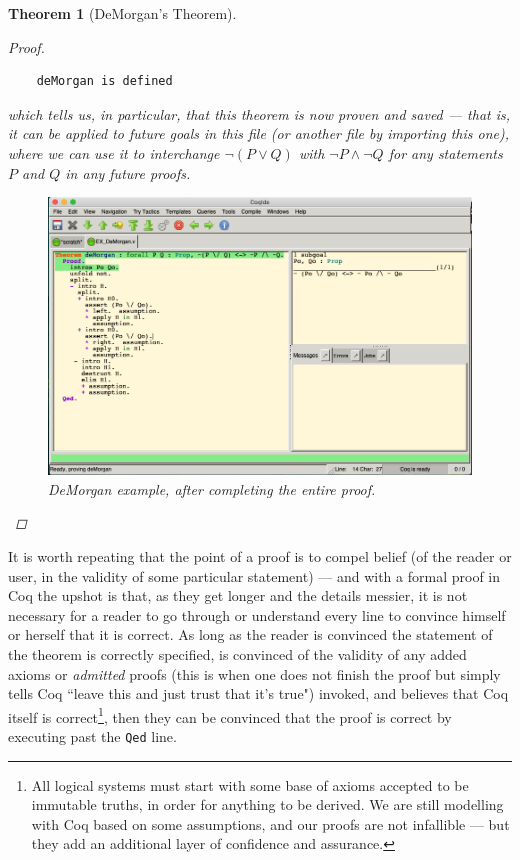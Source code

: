 \documentclass[12pt,notitlepage]{report}
\theoremstyle{plain}
\newtheorem{theo}{Theorem}[section]
\theoremstyle{definition}
\newcommand{\define}[1]{\emph{#1}\index{#1}}
\numberwithin{equation}{section}
\begin{document}
\begin{theo}[DeMorgan's Theorem]
\begin{proof}
\begin{verbatim}
    deMorgan is defined
\end{verbatim}
        which tells us, in particular, that this theorem is now proven and \emph{saved} --- that is, it can be \define{applied} to future goals in this file (or another file by importing this one), where we can use it to  interchange $\neg(P\lor Q)$ with $\neg P \land \neg Q$ for any statements $P$ and $Q$ in any future proofs.
        \par \noindent
\begin{figure}[H]
    \centering
          \includegraphics[scale=0.45]{DeMorgan}
              \caption{DeMorgan example, after completing the entire proof.}
    \label{fig:demorgan1}
\end{figure}
    \end{proof}
\end{theo}
It is worth repeating that the point of a proof is to compel belief (of the reader or user, in the validity of some particular statement) --- and with a formal proof in Coq the upshot is that, as they get longer and the details messier, it is not necessary for a reader to go through or understand every line to convince himself or herself that it is correct.  As long as the reader is convinced the statement of the theorem is correctly specified, is convinced of the validity of any added axioms or \define{admitted} proofs (this is when one does not finish the proof but simply tells Coq ``leave this and just trust that it's true") invoked, and believes that Coq itself is correct\footnote{All logical systems must start with some base of axioms accepted to be immutable truths, in order for anything to be derived.  We are still modelling with Coq based on some assumptions, and our proofs are not infallible --- but they add an additional layer of confidence and assurance.}, then they can be convinced that the proof is correct by executing past the \texttt{Qed} line.
\end{document}
